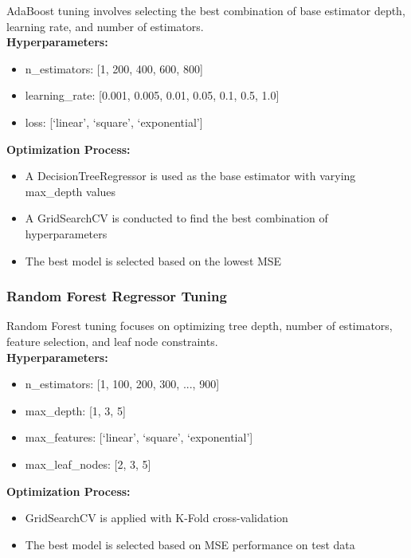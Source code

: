 AdaBoost tuning involves selecting the best combination of base estimator depth, learning rate, and number of
estimators. \\

\textbf{Hyperparameters:}

\begin{itemize}
    \item n\_estimators: [1, 200, 400, 600, 800]
    \item learning\_rate: [0.001, 0.005, 0.01, 0.05, 0.1, 0.5, 1.0]
    \item loss: [`linear', `square', `exponential']
\end{itemize}

\textbf{Optimization Process:}

\begin{itemize}
    \item A DecisionTreeRegressor is used as the base estimator with varying max\_depth values
    \item A GridSearchCV is conducted to find the best combination of hyperparameters
    \item The best model is selected based on the lowest MSE
\end{itemize}

\subsubsection{Random Forest Regressor Tuning}\label{sec:rf_regressor_tuning}

Random Forest tuning focuses on optimizing tree depth, number of estimators, feature
selection, and leaf node constraints. \\

\textbf{Hyperparameters:}

\begin{itemize}
    \item n\_estimators: [1, 100, 200, 300, ..., 900]
    \item max\_depth: [1, 3, 5]
    \item max\_features: [`linear', `square', `exponential']
    \item max\_leaf\_nodes: [2, 3, 5]
\end{itemize}

\textbf{Optimization Process:}

\begin{itemize}
    \item GridSearchCV is applied with K-Fold cross-validation
    \item The best model is selected based on MSE performance on test data
\end{itemize}

